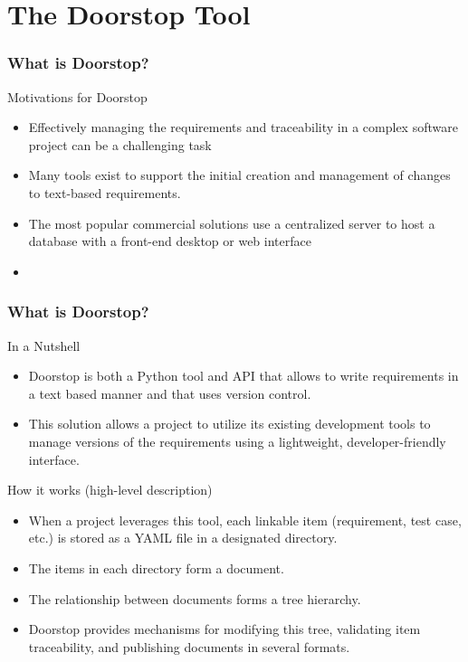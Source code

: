 \documentclass[aspectratio=169]{beamer}
\begin{document}
\section*{The Doorstop Tool}


\begin{frame}
  \frametitle{What is Doorstop?}
  \begin{block}{Motivations for Doorstop}
  \begin{itemize}
    \item Effectively managing the requirements and traceability in a complex software project can be a
challenging task
    \item Many tools exist to support the initial creation and management of changes to
text-based requirements.
    \item The most popular commercial solutions use a centralized server to host
a database with a front-end desktop or web interface
    \item {\bf }
  \end{itemize}
  
  \end{block}

   
\end{frame}

\begin{frame}
  \frametitle{What is Doorstop?}
  \begin{block}{In a Nutshell}
  \begin{itemize}
    \item Doorstop is both a Python tool and API that allows to write requirements in a text based manner and that uses version control. 
    \item This solution allows a project to utilize its existing development tools to manage versions of the requirements using a lightweight, developer-friendly interface.
  \end{itemize}
  \end{block}
  \begin{block}{How it works (high-level description)}
  \begin{itemize}
  \item When a project leverages this tool, each linkable item (requirement, test case, etc.) is stored as a YAML file in a designated directory. 
  \item The items in each directory form a document.
  \item The relationship between documents forms a tree hierarchy.
  \item Doorstop provides mechanisms for modifying this tree, validating item traceability, and publishing documents in several formats.  
  \end{itemize}

       
  \end{block}

  
\end{frame}
\end{document}
